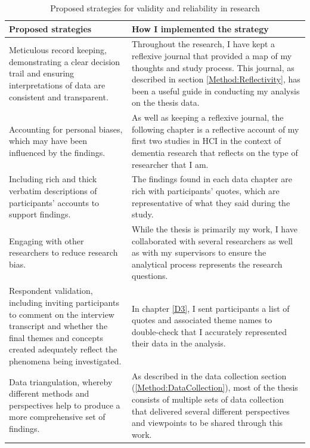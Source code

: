 \begin{center}
\begin{table}[htp]
\begin{tabular}{ | m{17em} | m{17em}|  } 
  \hline
  \textbf{Proposed strategies} & \textbf{How I implemented the strategy}  \\ 
  \hline
   Meticulous record keeping, demonstrating a clear decision trail and ensuring interpretations of data are consistent and transparent.
  &  Throughout the research, I have kept a reflexive journal that provided a map of my thoughts and study process. This journal, as described in section \ref{Method:Reflectivity}, has been a useful guide in conducting my analysis on the thesis data.
 \\ 
 \hline
 Accounting for personal biases, which may have been influenced by the findings. 
  & As well as keeping a reflexive journal, the following chapter is a reflective account of my first two studies in HCI in the context of dementia research that reflects on the type of researcher that I am. \\ 
  \hline
   Including rich and thick verbatim descriptions of participants’ accounts to support findings.
  & The findings found in each data chapter are rich with participants' quotes, which are representative of what they said during the study.  \\ 
  \hline
   Engaging with other researchers to reduce research bias.
  & While the thesis is primarily my work, I have collaborated with several researchers as well as with my supervisors to ensure the analytical process represents the research questions.  \\ 
  \hline
   Respondent validation, including inviting participants to comment on the interview transcript and whether the final themes and concepts created adequately reflect the phenomena being investigated.
  & In chapter \ref{D3}, I sent participants a list of quotes and associated theme names to double-check that I accurately represented their data in the analysis. \\ 
  \hline
   Data triangulation, whereby different methods and perspectives help to produce a more comprehensive set of findings.
  & As described in the data collection section (\ref{Method:DataCollection}), most of the thesis consists of multiple sets of data collection that delivered several different perspectives and viewpoints to be shared through this work.  \\ 
  \hline
  
\end{tabular}
\caption{Proposed strategies for validity and reliability in research}
\label{tab:ProposedStrategies}
\end{table}
\end{center}

